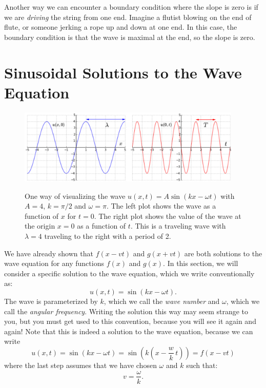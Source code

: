 \documentclass[12pt]{article}
\begin{document}
Another way we can encounter a boundary condition where the slope is zero is if we are {\em driving} the string from one end.  Imagine a flutist blowing on the end of flute, or someone jerking a rope up and down at one end.  In this case, the boundary condition is that the wave is maximal at the end, so the slope is zero.

\section{Sinusoidal Solutions to the Wave Equation}

\begin{figure}[thb]
\begin{center}
{\includegraphics[width=0.95\textwidth]{figs/wave1d.pdf}}
\end{center}
\caption{\label{fig:sine wave} One way of visualizing the wave $u(x,t) = A \sin(k x-\omega t)$ with $A=4$, $k=\pi / 2$ and $\omega = \pi$.  The left plot shows the wave as a function of $x$ for $t=0$.  The right plot shows the value of the wave at the origin $x=0$ as a function of $t$.  This is a traveling wave with $\lambda = 4$ traveling to the right with a period of 2.}
\end{figure}

We have already shown that $f(x - v t)$ and $g(x + vt)$ are both solutions to the wave
equation for any functions $f(x)$ and $g(x)$.   In this section, we will consider a specific solution to the wave equation, which we write conventionally as:
\begin{equation}
u(x,t) = \sin(k x - \omega t).
\end{equation}
The wave is parameterized by $k$, which we call the {\em wave number}
and $\omega$, which we call the {\em angular frequency}.  
Writing the solution this way may seem strange to you, but you must get used to this convention, because you will see it again and again!   Note that this is indeed a solution to the wave equation, because we can write  
\begin{equation}
u(x,t) = \sin(k x - \omega t) = \sin \left(k \left(x - \frac{w}{k} \, t \right) \right) = f(x-vt)
\end{equation}
where the last step assumes that we have chosen $\omega$ and $k$ such that:
\begin{equation}
v = \frac{\omega}{k}.
\end{equation}
\end{document}
